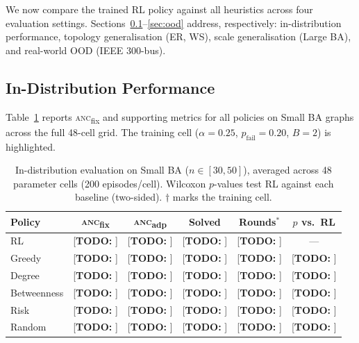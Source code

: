\documentclass[11pt]{article}
\newcommand{\anc}{\textsc{anc}}
\newcommand{\ancfix}{\anc{}\textsubscript{fix}}
\newcommand{\ancadp}{\anc{}\textsubscript{adp}}
\newcommand{\todo}[1]{\textcolor{red!70!black}{[\textbf{TODO:} #1]}}
\newcommand{\pfail}{p_{\mathrm{fail}}}
\begin{document}
We now compare the trained RL policy against all heuristics across four
evaluation settings.
Sections~\ref{sec:indist}--\ref{sec:ood} address, respectively:
in-distribution performance, topology generalisation (ER, WS),
scale generalisation (Large BA), and real-world OOD (IEEE 300-bus).

\subsection{In-Distribution Performance}
\label{sec:indist}

Table~\ref{tab:indist} reports \ancfix{} and supporting metrics for all
policies on Small BA graphs across the full 48-cell grid.
The training cell ($\alpha=0.25$, $\pfail=0.20$, $B=2$) is highlighted.

\begin{table}[htbp]
\centering
\caption{In-distribution evaluation on Small BA ($n\!\in\![30,50]$),
         averaged across 48 parameter cells (200 episodes/cell).
         Wilcoxon $p$-values test RL against each baseline (two-sided).
         $\dagger$ marks the training cell.}
\label{tab:indist}
\setlength{\tabcolsep}{6pt}
\begin{tabular}{lccccc}
\toprule
Policy      & \ancfix{}  & \ancadp{}  & Solved     & Rounds$^{*}$ & $p$ vs.\ RL \\
\midrule
RL          & \todo{}    & \todo{}    & \todo{}    & \todo{}      & --- \\
Greedy      & \todo{}    & \todo{}    & \todo{}    & \todo{}      & \todo{} \\
Degree      & \todo{}    & \todo{}    & \todo{}    & \todo{}      & \todo{} \\
Betweenness & \todo{}    & \todo{}    & \todo{}    & \todo{}      & \todo{} \\
Risk        & \todo{}    & \todo{}    & \todo{}    & \todo{}      & \todo{} \\
Random      & \todo{}    & \todo{}    & \todo{}    & \todo{}      & \todo{} \\
\bottomrule
\end{tabular}
\end{table}

\end{document}
